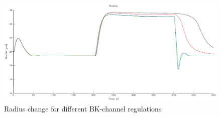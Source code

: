\begin{landscape}
		\begin{figure}[h!]
			\centering
			\tiny 
			\setlength\figureheight{7.5 cm} 
			\setlength\figurewidth{18 cm}
			\includegraphics{figures/BK_rad_NVU14.pdf}
			\caption{Radius change for different BK-channel regulations}
			\label{fig:SMCfluxes}
		\end{figure}
\end{landscape}

%
